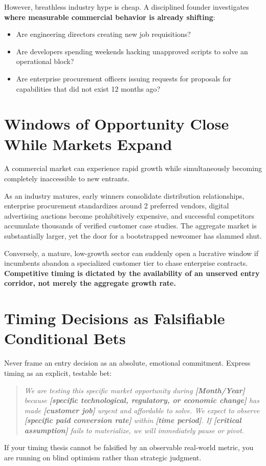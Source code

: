 However, breathless industry hype is cheap. A disciplined founder investigates \textbf{where measurable commercial behavior is already shifting}:
\begin{itemize}[leftmargin=12pt,itemsep=1pt,topsep=1pt]
  \item Are engineering directors creating new job requisitions?
  \item Are developers spending weekends hacking unapproved scripts to solve an operational block?
  \item Are enterprise procurement officers issuing requests for proposals for capabilities that did not exist 12 months ago?
\end{itemize}

\section{Windows of Opportunity Close While Markets Expand}

A commercial market can experience rapid growth while simultaneously becoming completely inaccessible to new entrants.

As an industry matures, early winners consolidate distribution relationships, enterprise procurement standardizes around 2 preferred vendors, digital advertising auctions become prohibitively expensive, and successful competitors accumulate thousands of verified customer case studies. The aggregate market is substantially larger, yet the door for a bootstrapped newcomer has slammed shut.

Conversely, a mature, low-growth sector can suddenly open a lucrative window if incumbents abandon a specialized customer tier to chase enterprise contracts. \textbf{Competitive timing is dictated by the availability of an unserved entry corridor, not merely the aggregate growth rate.}

\section{Timing Decisions as Falsifiable Conditional Bets}

Never frame an entry decision as an absolute, emotional commitment. Express timing as an explicit, testable bet:

\begin{quote}
\itshape
We are testing this specific market opportunity during \textbf{[Month/Year]} because \textbf{[specific technological, regulatory, or economic change]} has made \textbf{[customer job]} urgent and affordable to solve. We expect to observe \textbf{[specific paid conversion rate]} within \textbf{[time period]}. If \textbf{[critical assumption]} fails to materialize, we will immediately pause or pivot.
\end{quote}

If your timing thesis cannot be falsified by an observable real-world metric, you are running on blind optimism rather than strategic judgment.
